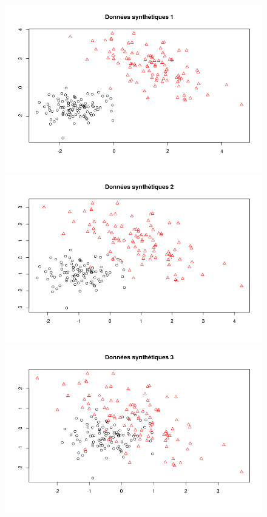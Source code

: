 \documentclass[a4paper, titlepage]{report}
\begin{document}
\begin{figure}[h]
	\begin{center}
		\includegraphics[scale = 0.22]{./doc/synt-1-reel.png}
		\includegraphics[scale = 0.22]{./doc/synt-2-reel.png}
		\includegraphics[scale = 0.22]{./doc/synt-3-reel.png}
	\end{center}
\end{figure}
\end{document}
